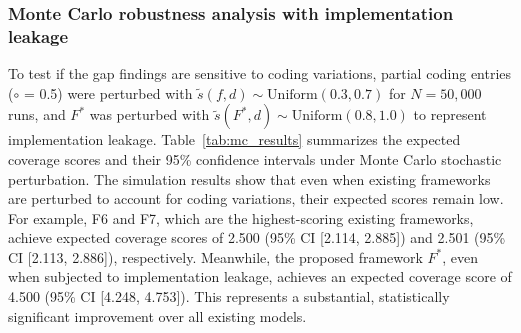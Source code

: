 \documentclass[11pt,a4paper]{article}
\newcommand{\partcov}{\textcolor{partcol}{\textbf{$\circ$}}}
\begin{document}
\subsubsection{Monte Carlo robustness analysis with implementation leakage}
To test if the gap findings are sensitive to coding variations, partial coding entries (\partcov{} = 0.5) were perturbed with $\tilde{s}(f,d) \sim \text{Uniform}(0.3, 0.7)$ for $N = 50,000$ runs, and $F^*$ was perturbed with $\tilde{s}(F^*,d) \sim \text{Uniform}(0.8, 1.0)$ to represent implementation leakage. Table~\ref{tab:mc_results} summarizes the expected coverage scores and their 95\% confidence intervals under Monte Carlo stochastic perturbation. The simulation results show that even when existing frameworks are perturbed to account for coding variations, their expected scores remain low. For example, F6 and F7, which are the highest-scoring existing frameworks, achieve expected coverage scores of 2.500 (95\% CI [2.114, 2.885]) and 2.501 (95\% CI [2.113, 2.886]), respectively. Meanwhile, the proposed framework $F^*$, even when subjected to implementation leakage, achieves an expected coverage score of 4.500 (95\% CI [4.248, 4.753]). This represents a substantial, statistically significant improvement over all existing models.
\end{document}
